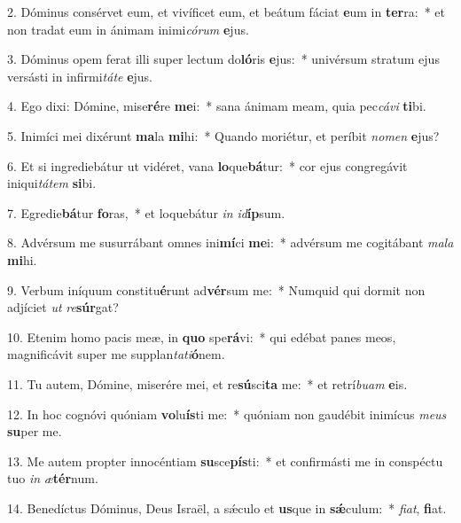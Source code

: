 2. Dóminus consérvet eum, et vivíficet eum, et beátum fáciat \textbf{e}um in \textbf{ter}ra:~*  et non tradat eum in ánimam inimi\textit{có}\textit{rum} \textbf{e}jus.\

3. Dóminus opem ferat illi super lectum do\textbf{ló}ris \textbf{e}jus:~*  univérsum stratum ejus versásti in infirmi\textit{tá}\textit{te} \textbf{e}jus.\

4. Ego dixi: Dómine, mise\textbf{ré}re \textbf{me}i:~*  sana ánimam meam, quia pec\textit{cá}\textit{vi} \textbf{ti}bi.\

5. Inimíci mei dixérunt \textbf{ma}la \textbf{mi}hi:~*  Quando moriétur, et períbit \textit{no}\textit{men} \textbf{e}jus?\

6. Et si ingrediebátur ut vidéret, vana \textbf{lo}que\textbf{bá}tur:~*  cor ejus congregávit iniqui\textit{tá}\textit{tem} \textbf{si}bi.\

7. Egredie\textbf{bá}tur \textbf{fo}ras,~*  et loquebátur \textit{in} \textit{id}\textbf{íp}sum.\

8. Advérsum me susurrábant omnes ini\textbf{mí}ci \textbf{me}i:~*  advérsum me cogitábant \textit{ma}\textit{la} \textbf{mi}hi.\

9. Verbum iníquum constitu\textbf{é}runt ad\textbf{vér}sum me:~*  Numquid qui dormit non adjíciet \textit{ut} \textit{re}\textbf{súr}gat?\

10. Etenim homo pacis meæ, in \textbf{quo} spe\textbf{rá}vi:~*  qui edébat panes meos, magnificávit super me supplan\textit{ta}\textit{ti}\textbf{ó}nem.\

11. Tu autem, Dómine, miserére mei, et re\textbf{sú}sci\textbf{ta} me:~*  et retrí\textit{bu}\textit{am} \textbf{e}is.\

12. In hoc cognóvi quóniam \textbf{vo}lu\textbf{ís}ti me:~*  quóniam non gaudébit inimícus \textit{me}\textit{us} \textbf{su}per me.\

13. Me autem propter innocéntiam \textbf{su}sce\textbf{pís}ti:~*  et confirmásti me in conspéctu tuo \textit{in} \textit{æ}\textbf{tér}num.\

14. Benedíctus Dóminus, Deus Israël, a sǽculo et \textbf{us}que in \textbf{sǽ}culum:~*  \textit{fi}\textit{at}, \textbf{fi}at.\

